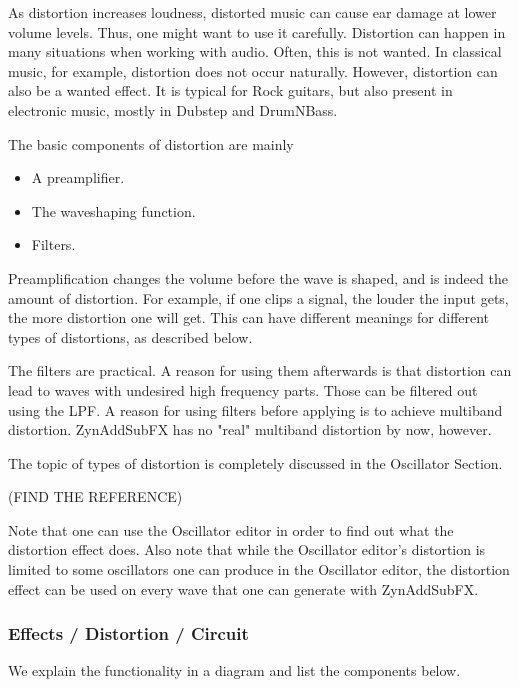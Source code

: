    As distortion increases loudness, distorted music can cause ear damage at
   lower volume levels. Thus, one might want to use it carefully.
   Distortion can happen in many situations when working with audio. Often,
   this is not wanted. In classical music, for example, distortion does not
   occur naturally. However, distortion can also be a wanted effect. It is
   typical for Rock guitars, but also present in electronic music, mostly in
   Dubstep and DrumNBass.

   The basic components of distortion are mainly

   \begin{itemize}
      \item A preamplifier.
      \item The waveshaping function.
      \item Filters.
   \end{itemize}

   Preamplification changes the volume before the wave is shaped, and is
   indeed the amount of distortion. For example, if one clips a signal, the
   louder the input gets, the more distortion one will get. This can have
   different meanings for different types of distortions, as described below.

   The filters are practical. A reason for using them afterwards is that
   distortion can lead to waves with undesired high frequency parts. Those
   can be filtered out using the LPF. A reason for using filters before
   applying is to achieve multiband distortion. ZynAddSubFX has no "real"
   multiband distortion by now, however.

   The topic of types of distortion is completely discussed in the
   Oscillator Section.

   (FIND THE REFERENCE)

   Note that one can use the Oscillator editor in order
   to find out what the distortion effect does. Also note that while the
   Oscillator editor’s distortion is limited to some oscillators one can
   produce in the Oscillator editor, the distortion effect can be used on
   every wave that one can generate with ZynAddSubFX.

\subsubsection{Effects / Distortion / Circuit}
\label{subsubsec:effects_edit_distortion_circuit}

   We explain the functionality in a diagram and list the components below.

